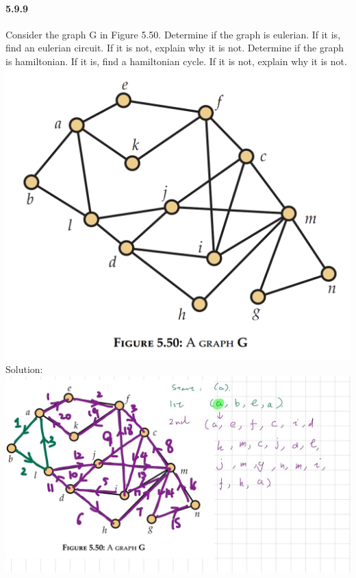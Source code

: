 \documentclass{article}
\begin{document}
\paragraph{5.9.9}
Consider the graph G in Figure 5.50. Determine if the graph is eulerian. If it is, find an eulerian circuit. If it is not, explain why it is not. Determine if the graph is hamiltonian. If it is, find a hamiltonian cycle. If it is not, explain why it is not.\newline
\includegraphics{0075}\newline
Solution:\newline
\includegraphics{5.50}
\end{document}
